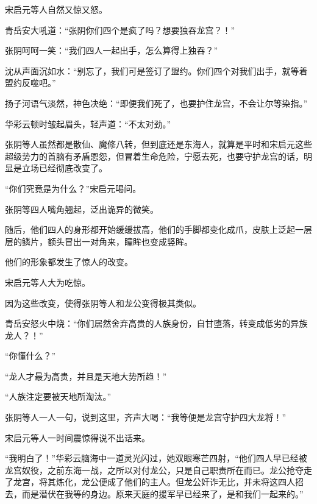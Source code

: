 \begin{this_body}
宋启元等人自然又惊又怒。

青岳安大吼道：“张阴你们四个是疯了吗？想要独吞龙宫？！”

张阴呵呵一笑：“我们四人一起出手，怎么算得上独吞？”

沈从声面沉如水：“别忘了，我们可是签订了盟约。你们四个对我们出手，就等着盟约反噬吧。”

扬子河语气淡然，神色决绝：“即便我们死了，也要护住龙宫，不会让尔等染指。”

华彩云顿时皱起眉头，轻声道：“不太对劲。”

张阴等人虽然都是散仙、魔修八转，但到底还是东海人，就算是平时和宋启元这些超级势力的首脑有矛盾恩怨，但冒着生命危险，宁愿去死，也要守护龙宫的话，明显是立场已经彻底改变了。

“你们究竟是为什么？”宋启元喝问。

张阴等四人嘴角翘起，泛出诡异的微笑。

随后，他们四人的身形都开始缓缓拔高，他们的手脚都变化成爪，皮肤上泛起一层层的鳞片，额头冒出一对角来，瞳眸也变成竖眸。

他们的形象都发生了惊人的改变。

宋启元等人大为吃惊。

因为这些改变，使得张阴等人和龙公变得极其类似。

青岳安怒火中烧：“你们居然舍弃高贵的人族身份，自甘堕落，转变成低劣的异族龙人？！”

“你懂什么？”

“龙人才最为高贵，并且是天地大势所趋！”

“人族注定要被天地所淘汰。”

张阴等人一人一句，说到这里，齐声大喝：“我等便是龙宫守护四大龙将！”

宋启元等人一时间震惊得说不出话来。

“我明白了！”华彩云脑海中一道灵光闪过，她双眼寒芒四射，“他们四人早已经被龙宫奴役，之前东海一战，之所以对付龙公，只是自己职责所在而已。龙公抢夺走了龙宫，将其炼化，龙公便成了他们的主人。但龙公奸诈无比，并未将这四人招去，而是潜伏在我等的身边。原来天庭的援军早已经来了，是和我们一起来的。”

\end{this_body}

